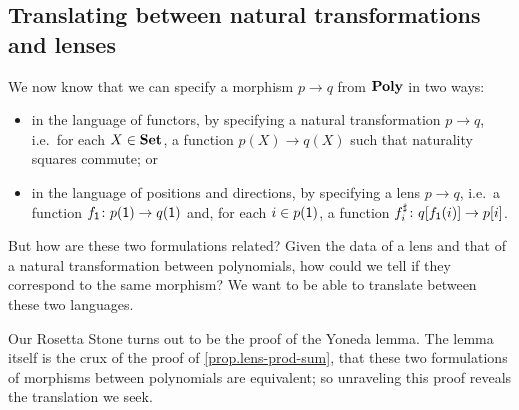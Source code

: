 \documentclass[Book-Poly]{subfiles}
\begin{document}
\subsection{Translating between natural transformations and lenses} \label{subsec.poly.cat.morph.translate}
We now know that we can specify a morphism $p\to q$ from $\mathbf{Poly}$ in two ways:
\begin{itemize}
    \item in the language of functors, by specifying a natural transformation $p \to q$, i.e.\ for each $X\in\mathbf{Set}$, a function $p(X)\to q(X)$ such that naturality squares commute; or
    \item in the language of positions and directions, by specifying a lens $p\to q$, i.e.\ a function $f_{\textsf{1}} \colon p(\textsf{1}) \to q(\textsf{1})$ and, for each $i \in p(\textsf{1})$, a function $f^\sharp_i \colon q[f_{\textsf{1}}(i)] \to p[i]$.
\end{itemize}
But how are these two formulations related?
Given the data of a lens and that of a natural transformation between polynomials, how could we tell if they correspond to the same morphism?
We want to be able to translate between these two languages.

Our Rosetta Stone turns out to be the proof of the Yoneda lemma.
The lemma itself is the crux of the proof of \cref{prop.lens-prod-sum}, that these two formulations of morphisms between polynomials are equivalent; so unraveling this proof reveals the translation we seek.
\end{document}
